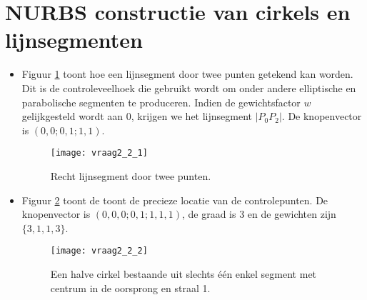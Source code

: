 \section{NURBS constructie van cirkels en lijnsegmenten  }
\begin{enumerate}
	{
		\begin{itemize} 
			\item Figuur \ref{fig:vraag2_2_1} toont hoe een lijnsegment door twee punten getekend kan worden. Dit is de controleveelhoek die gebruikt wordt om onder andere elliptische en parabolische segmenten te produceren. Indien de gewichtsfactor $w$ gelijkgesteld wordt aan 0, krijgen we het lijnsegment $|P_0P_2|$. De knopenvector is $(0, 0 ; 0, 1 ; 1, 1)$.
			\begin{figure}[ht]
				\centering
				\texttt{[image: vraag2\_2\_1]}
				\caption{Recht lijnsegment door twee punten.}
				\label{fig:vraag2_2_1}
			\end{figure}
		\end{itemize}}
			
	{
		\begin{itemize} 
		\item Figuur \ref{fig:vraag2_2_2} toont de toont de precieze locatie van de controlepunten. De knopenvector is $(0, 0, 0; 0 , 1; 1, 1, 1)$, de graad is 3 en de gewichten zijn $\{3, 1, 1, 3\}$.
		\begin{figure}[ht]
			\centering
			\texttt{[image: vraag2\_2\_2]}
			\caption{Een halve cirkel bestaande uit slechts één enkel segment met centrum in de oorsprong en straal 1.}
			\label{fig:vraag2_2_2}
		\end{figure}
		\end{itemize}
	}
			

\end{enumerate}
